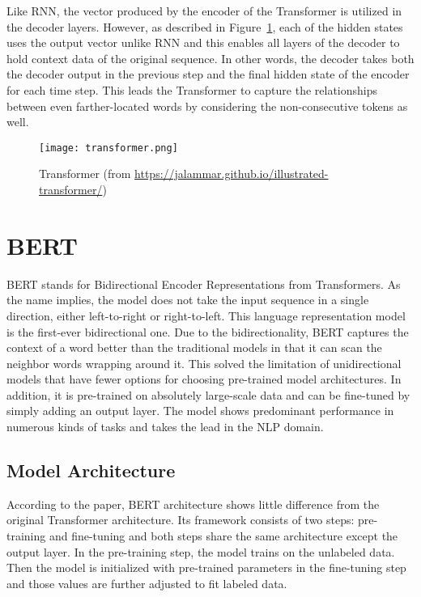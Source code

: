 \documentclass[letterpaper, 11pt]{article}
\begin{document}
Like RNN, the vector produced by the encoder of the Transformer is utilized in the decoder layers. However, as described in Figure~\ref{fig:transformer}, each of the hidden states uses the output vector unlike RNN and this enables all layers of the decoder to hold context data of the original sequence. In other words, the decoder takes both the decoder output in the previous step and the final hidden state of the encoder for each time step.  This leads the Transformer to capture the relationships between even farther-located words by considering the non-consecutive tokens as well.

\begin{figure}
    \centering
    \texttt{[image: transformer.png]}
    \caption{Transformer (from \url{https://jalammar.github.io/illustrated-transformer/})}
    \label{fig:transformer}
\end{figure}


\section{BERT}
\label{sec:section}
BERT \citep{devlin-etal-2019-bert} stands for Bidirectional Encoder Representations from Transformers. As the name implies, the model does not take the input sequence in a single direction, either left-to-right or right-to-left. This language representation model is the first-ever bidirectional one. Due to the bidirectionality, BERT captures the context of a word better than the traditional models in that it can scan the neighbor words wrapping around it. This solved the limitation of unidirectional models that have fewer options for choosing pre-trained model architectures. In addition, it is pre-trained on absolutely large-scale data and can be fine-tuned by simply adding an output layer. The model shows predominant performance in numerous kinds of tasks and takes the lead in the NLP domain.


\subsection{Model Architecture}
\label{sec:bert-architecture}
According to the paper, BERT architecture shows little difference from the original Transformer architecture. Its framework consists of two steps: pre-training and fine-tuning and both steps share the same architecture except the output layer. In the pre-training step, the model trains on the unlabeled data. Then the model is initialized with pre-trained parameters in the fine-tuning step and those values are further adjusted to fit labeled data.
\end{document}
